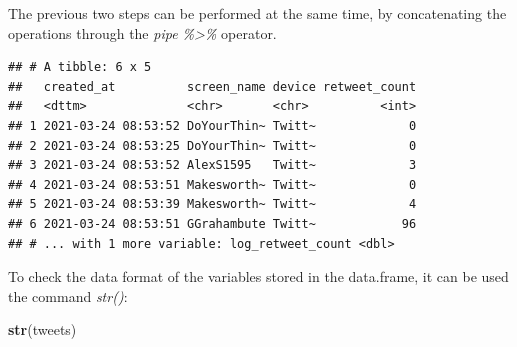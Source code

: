 \documentclass[
]{article}
\newenvironment{Shaded}{\begin{snugshade}}{\end{snugshade}}
\newcommand{\CommentTok}[1]{\textcolor[rgb]{0.56,0.35,0.01}{\textit{#1}}}
\newcommand{\DataTypeTok}[1]{\textcolor[rgb]{0.13,0.29,0.53}{#1}}
\newcommand{\DecValTok}[1]{\textcolor[rgb]{0.00,0.00,0.81}{#1}}
\newcommand{\KeywordTok}[1]{\textcolor[rgb]{0.13,0.29,0.53}{\textbf{#1}}}
\newcommand{\NormalTok}[1]{#1}
\newcommand{\OperatorTok}[1]{\textcolor[rgb]{0.81,0.36,0.00}{\textbf{#1}}}
\newcommand{\StringTok}[1]{\textcolor[rgb]{0.31,0.60,0.02}{#1}}
\begin{document}
The previous two steps can be performed at the same time, by concatenating the operations through the \emph{pipe \%\textgreater\%} operator.

\begin{Shaded}
\end{Shaded}

\begin{verbatim}
## # A tibble: 6 x 5
##   created_at          screen_name device retweet_count
##   <dttm>              <chr>       <chr>          <int>
## 1 2021-03-24 08:53:52 DoYourThin~ Twitt~             0
## 2 2021-03-24 08:53:25 DoYourThin~ Twitt~             0
## 3 2021-03-24 08:53:52 AlexS1595   Twitt~             3
## 4 2021-03-24 08:53:51 Makesworth~ Twitt~             0
## 5 2021-03-24 08:53:39 Makesworth~ Twitt~             4
## 6 2021-03-24 08:53:51 GGrahambute Twitt~            96
## # ... with 1 more variable: log_retweet_count <dbl>
\end{verbatim}

To check the data format of the variables stored in the data.frame, it can be used the command \emph{str()}:

\begin{Shaded}
\begin{Highlighting}[]
\KeywordTok{str}\NormalTok{(tweets)}
\end{Highlighting}
\end{Shaded}
\end{document}
